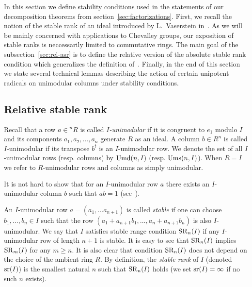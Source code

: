 In this section we define stability conditions used in the statements of our decomposition theorems from section~\ref{sec:factorizations}.
First, we recall the notion of the stable rank of an ideal introduced by L.~Vaserstein in~\cite{Va69, Va71}.
As we will be mainly concerned with applications to Chevalley groups, our exposition of stable ranks is neccessarily limited to commutative rings.
The main goal of the subsection~\ref{sec:rel-asr} is to define the relative version of the absolute stable rank condition which generalizes the definition of~\cite{EO, MKV}.
Finally, in the end of this section we state several technical lemmas describing the action of certain unipotent radicals on unimodular columns under stability conditions.

\subsection{Relative stable rank}
Recall that a row $a\in{}^n\!R$ is called \emph{$I$-unimodular} if it is congruent to $e_1$ modulo $I$ and its components $a_1,a_2,\ldots,a_n$ generate $R$ as an ideal.
A column $b \in R^n$ is called $I$-unimodular if its transpose $b^t$ is an $I$-unimodular row.
We denote the set of all $I$-unimodular rows (resp. columns) by $\operatorname{Umd}(n, I)$ (resp. $\operatorname{Ums}(n, I)$).
When $R=I$ we refer to $R$-unimodular rows and columns as simply unimodular.

It is not hard to show that for an $I$-unimodular row $a$ there exists an $I$-unimodular column $b$ such that $ab=1$ (see~\cite[\S~2]{Va69}).

An $I$-unimodular row $a=(a_1,\ldots a_{n+1})$ is called \emph{stable} if one can choose $b_1,\ldots,b_n\in I$ such that the row $(a_1+a_{n+1}b_1,\ldots,a_n+a_{n+1}b_n)$ is also $I$-unimodular. 
We say that $I$ satisfies stable range condition $\operatorname{SR}_n(I)$ if any $I$-unimodular row of length $n+1$ is stable.
It is easy to see that $\operatorname{SR}_n(I)$ implies $\operatorname{SR}_m(I)$ for any $m\geqslant n$. 
It is also clear that condition $\operatorname{SR}_n(I)$ does not depend on the choice of the ambient ring $R$.
By definition, the {\it stable rank} of $I$ (denoted $\operatorname{sr}(I)$) is the smallest natural $n$ such that $\operatorname{SR}_n(I)$ holds (we set $\operatorname{sr}(I)=\infty$ if no such $n$ exists).

